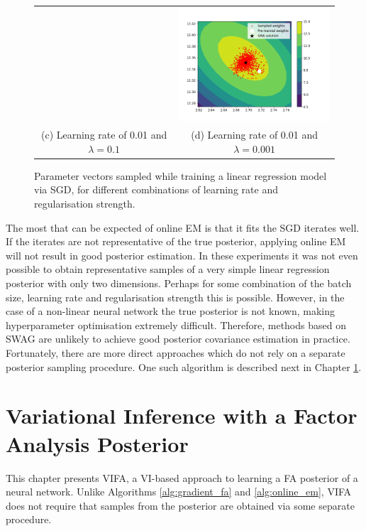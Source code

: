 \documentclass[msc,deptreport.inf]{infthesis} %
\begin{document}
\begin{figure}[!htbp]
\begin{tabular}{cc}
		 & \includegraphics[width=70mm]{plots/linear_model_weight_iterates__lr=0.01__lambda=0.001.png} \\
		 (c) Learning rate of 0.01 and $\lambda = 0.1$
		 & (d) Learning rate of 0.01 and $\lambda = 0.001$ \\[6pt]
	\end{tabular}
	\caption{Parameter vectors sampled while training a linear regression model via SGD, for different combinations of learning rate and regularisation strength. 
	}
	\label{fig:linear_regression_pdfs}
\end{figure}

The most that can be expected of online EM is that it fits the SGD iterates well. If the iterates are not representative of the true posterior, applying online EM will not result in good posterior estimation. In these experiments it was not even possible to obtain representative samples of a very simple linear regression posterior with only two dimensions. Perhaps for some combination of the batch size, learning rate and regularisation strength this is possible. However, in the case of a non-linear neural network the true posterior is not known, making hyperparameter optimisation extremely difficult. Therefore, methods based on SWAG are unlikely to achieve good posterior covariance estimation in practice. Fortunately, there are more direct approaches which do not rely on a separate posterior sampling procedure. One such algorithm is described next in Chapter \ref{ch:vifa}.


\chapter{Variational Inference with a Factor Analysis Posterior}\label{ch:vifa}

This chapter presents VIFA, a VI-based approach to learning a FA posterior of a neural network. Unlike Algorithms \ref{alg:gradient_fa} and \ref{alg:online_em}, VIFA does not require that samples from the posterior are obtained via some separate procedure. 
\end{document}
